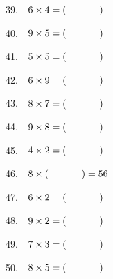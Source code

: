 \documentclass[a4paper]{extarticle}
\begin{document}
\begin{multicols}{3}
39. \,\, $6 \times 4 = (\hspace{1.2cm})$

40. \,\, $9 \times 5 = (\hspace{1.2cm})$

41. \,\, $5 \times 5 = (\hspace{1.2cm})$

42. \,\, $6 \times 9 = (\hspace{1.2cm})$

43. \,\, $8 \times 7 = (\hspace{1.2cm})$

44. \,\, $9 \times 8 = (\hspace{1.2cm})$

45. \,\, $4 \times 2 = (\hspace{1.2cm})$

46. \,\, $8 \times (\hspace{1.2cm}) = 56$

47. \,\, $6 \times 2 = (\hspace{1.2cm})$

48. \,\, $9 \times 2 = (\hspace{1.2cm})$

49. \,\, $7 \times 3 = (\hspace{1.2cm})$

50. \,\, $8 \times 5 = (\hspace{1.2cm})$

\end{multicols}
\end{document}
